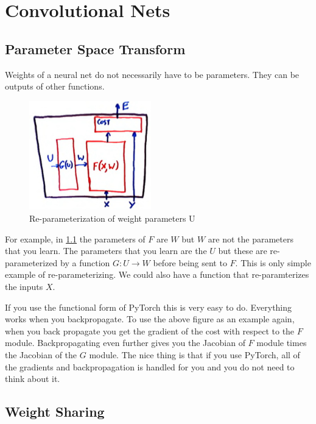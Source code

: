 \chapter{Convolutional Nets}

\section{Parameter Space Transform}

Weights of a neural net do not necessarily have to be parameters. 
They can be outputs of other functions.

\begin{figure}
    \centering
    \includegraphics[width=150pt]{lectures/03-a/images/parameterize.png}
    \caption{Re-parameterization of weight parameters U}
    \label{fig:param}
\end{figure}

For example, in \cref{fig:param} the parameters of $F$ are $W$ but $W$ are not the parameters that you learn. 
The parameters that you learn are the $U$ but these are re-parameterized by a function $G:U\rightarrow W$ before being sent to $F$. 
This is only simple example of re-parameterizing. 
We could also have a function that re-paramterizes the inputs $X$.

If you use the functional form of PyTorch this is very easy to do. 
Everything works when you backpropagate. 
To use the above figure as an example again, when you back propagate you get the gradient of the cost with respect to the $F$ module. 
Backpropagating even further gives you the Jacobian of $F$ module times the Jacobian of the $G$ module. 
The nice thing is that if you use PyTorch, all of the gradients and backpropagation is handled for you and you do not need to think about it. 

\section{Weight Sharing}

